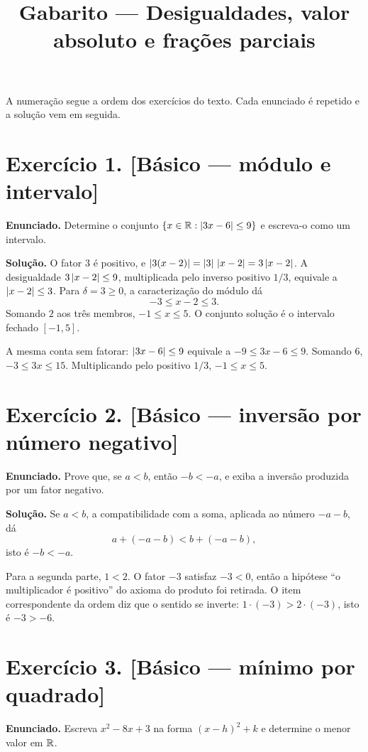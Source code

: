 \documentclass[11pt,a4paper]{article}
\title{Gabarito --- Desigualdades, valor absoluto e frações parciais}
\author{}
\date{}
\begin{document}
\maketitle
\tableofcontents

A numeração segue a ordem dos exercícios do texto. Cada enunciado é repetido e a solução vem em seguida.

\section*{Exercício 1. [Básico --- módulo e intervalo]}

\textbf{Enunciado.} Determine o conjunto $\{x\in\mathbb{R}:\left\lvert 3x-6 \right\rvert\le 9\}$ e escreva-o como um intervalo.

\textbf{Solução.}
O fator $3$ é positivo, e $\left\lvert 3(x-2) \right\rvert=\left\lvert 3 \right\rvert\,\left\lvert x-2 \right\rvert=3\left\lvert x-2 \right\rvert$. A desigualdade $3\left\lvert x-2 \right\rvert\le 9$, multiplicada pelo inverso positivo $1/3$, equivale a $\left\lvert x-2 \right\rvert\le 3$. Para $\delta=3\ge 0$, a caracterização do módulo dá
\[
-3\le x-2\le 3.
\]
Somando $2$ aos três membros, $-1\le x\le 5$. O conjunto solução é o intervalo fechado $[-1,5]$.

A mesma conta sem fatorar: $\left\lvert 3x-6 \right\rvert\le 9$ equivale a $-9\le 3x-6\le 9$. Somando $6$, $-3\le 3x\le 15$. Multiplicando pelo positivo $1/3$, $-1\le x\le 5$.

\section*{Exercício 2. [Básico --- inversão por número negativo]}

\textbf{Enunciado.} Prove que, se $a<b$, então $-b<-a$, e exiba a inversão produzida por um fator negativo.

\textbf{Solução.}
Se $a<b$, a compatibilidade com a soma, aplicada ao número $-a-b$, dá
\[
a+(-a-b)<b+(-a-b),
\]
isto é $-b<-a$.

Para a segunda parte, $1<2$. O fator $-3$ satisfaz $-3<0$, então a hipótese ``o multiplicador é positivo'' do axioma do produto foi retirada. O item correspondente da ordem diz que o sentido se inverte: $1\cdot(-3)>2\cdot(-3)$, isto é $-3>-6$.

\section*{Exercício 3. [Básico --- mínimo por quadrado]}

\textbf{Enunciado.} Escreva $x^2-8x+3$ na forma $(x-h)^2+k$ e determine o menor valor em $\mathbb{R}$.
\end{document}
